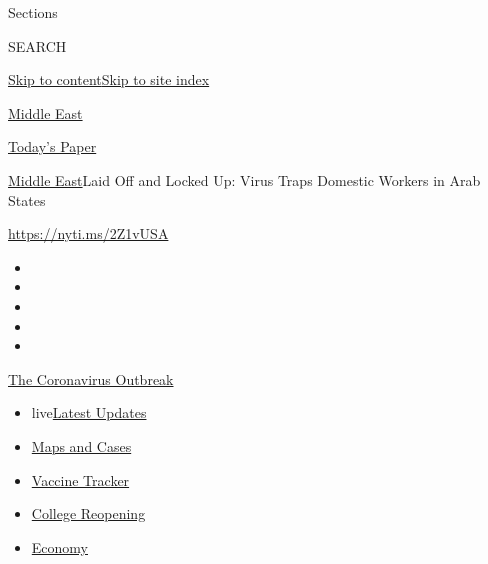 Sections

SEARCH

\protect\hyperlink{site-content}{Skip to
content}\protect\hyperlink{site-index}{Skip to site index}

\href{https://www.nytimes3xbfgragh.onion/section/world/middleeast}{Middle
East}

\href{https://myaccount.nytimes3xbfgragh.onion/auth/login?response_type=cookie\&client_id=vi}{}

\href{https://www.nytimes3xbfgragh.onion/section/todayspaper}{Today's
Paper}

\href{/section/world/middleeast}{Middle East}\textbar{}Laid Off and
Locked Up: Virus Traps Domestic Workers in Arab States

\url{https://nyti.ms/2Z1vUSA}

\begin{itemize}
\item
\item
\item
\item
\item
\end{itemize}

\href{https://www.nytimes3xbfgragh.onion/news-event/coronavirus?action=click\&pgtype=Article\&state=default\&region=TOP_BANNER\&context=storylines_menu}{The
Coronavirus Outbreak}

\begin{itemize}
\tightlist
\item
  live\href{https://www.nytimes3xbfgragh.onion/2020/08/04/world/coronavirus-cases.html?action=click\&pgtype=Article\&state=default\&region=TOP_BANNER\&context=storylines_menu}{Latest
  Updates}
\item
  \href{https://www.nytimes3xbfgragh.onion/interactive/2020/us/coronavirus-us-cases.html?action=click\&pgtype=Article\&state=default\&region=TOP_BANNER\&context=storylines_menu}{Maps
  and Cases}
\item
  \href{https://www.nytimes3xbfgragh.onion/interactive/2020/science/coronavirus-vaccine-tracker.html?action=click\&pgtype=Article\&state=default\&region=TOP_BANNER\&context=storylines_menu}{Vaccine
  Tracker}
\item
  \href{https://www.nytimes3xbfgragh.onion/2020/08/02/us/covid-college-reopening.html?action=click\&pgtype=Article\&state=default\&region=TOP_BANNER\&context=storylines_menu}{College
  Reopening}
\item
  \href{https://www.nytimes3xbfgragh.onion/live/2020/08/04/business/stock-market-today-coronavirus?action=click\&pgtype=Article\&state=default\&region=TOP_BANNER\&context=storylines_menu}{Economy}
\end{itemize}

